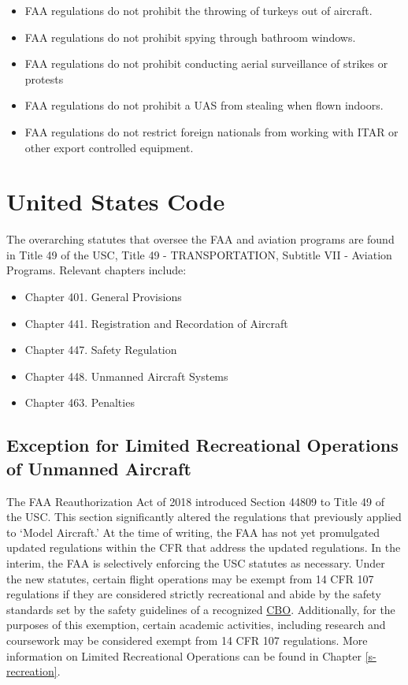 \documentclass[
]{book}
\providecommand{\tightlist}{%
  \setlength{\itemsep}{0pt}\setlength{\parskip}{0pt}}
\begin{document}
\begin{itemize}
\tightlist
\item
  FAA regulations do not prohibit the throwing of turkeys out of aircraft.
\item
  FAA regulations do not prohibit spying through bathroom windows.
\item
  FAA regulations do not prohibit conducting aerial surveillance of strikes or protests
\item
  FAA regulations do not prohibit a UAS from stealing when flown indoors.
\item
  FAA regulations do not restrict foreign nationals from working with ITAR or other export controlled equipment.
\end{itemize}

\hypertarget{united-states-code}{%
\section{United States Code}\label{united-states-code}}

The overarching statutes that oversee the FAA and aviation programs are found in Title 49 of the USC, Title 49 - TRANSPORTATION, Subtitle VII - Aviation Programs. Relevant chapters include:

\begin{itemize}
\tightlist
\item
  Chapter 401. General Provisions
\item
  Chapter 441. Registration and Recordation of Aircraft
\item
  Chapter 447. Safety Regulation
\item
  Chapter 448. Unmanned Aircraft Systems
\item
  Chapter 463. Penalties
\end{itemize}

\hypertarget{ss-recreation}{%
\subsection{Exception for Limited Recreational Operations of Unmanned Aircraft}\label{ss-recreation}}

The FAA Reauthorization Act of 2018 introduced Section 44809 to Title 49 of the USC. This section significantly altered the regulations that previously applied to `Model Aircraft.' At the time of writing, the FAA has not yet promulgated updated regulations within the CFR that address the updated regulations. In the interim, the FAA is selectively enforcing the USC statutes as necessary. Under the new statutes, certain flight operations may be exempt from 14 CFR 107 regulations if they are considered strictly recreational and abide by the safety standards set by the safety guidelines of a recognized \protect\hyperlink{CBO}{CBO}. Additionally, for the purposes of this exemption, certain academic activities, including research and coursework may be considered exempt from 14 CFR 107 regulations. More information on Limited Recreational Operations can be found in Chapter \ref{s-recreation}.
\end{document}
